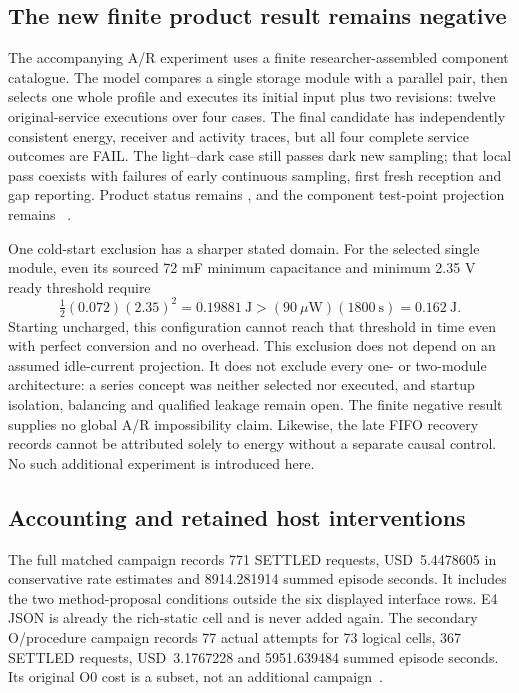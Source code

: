 \subsection{The new finite product result remains negative}
The accompanying A/R experiment uses a finite researcher-assembled component
catalogue. The model compares a single storage module with a parallel pair,
then selects one whole profile and executes its initial input plus two
revisions: twelve original-service executions over four cases. The final
candidate has independently consistent energy, receiver and activity traces,
but all four complete service outcomes are FAIL. The light--dark case still
passes dark new sampling; that local pass coexists with failures of early
continuous sampling, first fresh reception and gap reporting. Product status
remains , and the component test-point projection remains
~\cite{abca}.

One cold-start exclusion has a sharper stated domain. For the selected single
module, even its sourced 72 mF minimum capacitance and minimum 2.35 V ready
threshold require
\begin{equation}
 \tfrac12(0.072)(2.35)^2=0.19881~\mathrm J
 > (90~\mu\mathrm W)(1800~\mathrm s)=0.162~\mathrm J.
\end{equation}
Starting uncharged, this configuration cannot reach that threshold in time
even with perfect conversion and no overhead. This exclusion does not depend
on an assumed idle-current projection. It does not exclude every one- or
two-module architecture: a series concept was neither selected nor executed,
and startup isolation, balancing and qualified leakage remain open. The
finite negative result supplies no global A/R impossibility claim. Likewise,
the late FIFO recovery records cannot be attributed solely to energy without
a separate causal control. No such additional experiment is introduced here.

\subsection{Accounting and retained host interventions}
The full matched campaign records 771 SETTLED requests,
USD~5.4478605 in conservative rate estimates and 8914.281914 summed
episode seconds. It includes the two method-proposal conditions
outside the six displayed interface rows. E4 JSON is already the
rich-static cell and is never added again. The secondary O/procedure
campaign records 77 actual attempts for 73 logical cells, 367
SETTLED requests, USD~3.1767228 and 5951.639484 summed episode
seconds. Its original O0 cost is a subset, not an additional
campaign~\cite{comparison,transfer,preservation}.

